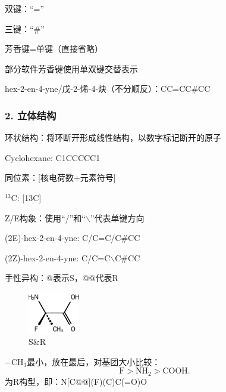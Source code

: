 双键：“=”

三键：“\#”

芳香键=单键（直接省略）
\begin{notation}
    部分软件芳香键使用单双键交替表示
\end{notation}
\begin{eg}
    hex-2-en-4-yne/戊-2-烯-4-炔（不分顺反）：CC=CC\#CC
\end{eg}
\subsubsection*{2. 立体结构}%
\label{subsub:2-立体结构}
环状结构：将环断开形成线性结构，以数字标记断开的原子
\begin{eg}
    Cyclohexane: C1CCCCC1
\end{eg}
同位素：[核电荷数+元素符号]
\begin{eg}
    $^{13}\text{C}$: [13C]
\end{eg}
Z/E构象：使用“/”和“$\backslash$”代表单键方向
\begin{eg}
    (2E)-hex-2-en-4-yne: C/C=C/C\#CC

    (2Z)-hex-2-en-4-yne: C/C=C$\backslash$C\#CC
\end{eg}
手性异构：@表示S，@@代表R
\begin{eg}
\begin{figure}[htpb]
    \centering
    \includegraphics[width=0.2\textwidth]{fig/S&R}
    \caption{S\&R}
    \label{fig:fig-S-R}
\end{figure}
$-\text{CH}_{3}$最小，放在最后，对基团大小比较：
\[
    \text{F}>\text{NH}_{2}>\text{COOH}
.\] 
为R构型，即：N[C@@](F)(C)C(=O)O
\end{eg}

